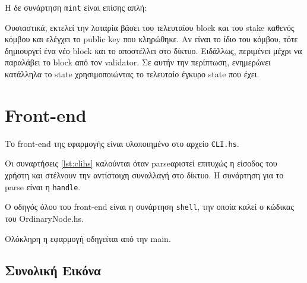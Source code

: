 \documentclass{article}
\newcommand{\eng}[1]{\foreignlanguage{english}{#1}} %
\begin{document}
Η δε συνάρτηση \texttt{\eng{mint}} είναι επίσης απλή:



Ουσιαστικά, εκτελεί την λοταρία βάσει του τελευταίου \eng{block} και του \eng{stake}
καθενός κόμβου και ελέγχει το \eng{public key} που κληρώθηκε. Αν είναι το ίδιο
του κόμβου, τότε δημιουργεί ένα νέο \eng{block} και το αποστέλλει στο δίκτυο.
Ειδάλλως, περιμένει μέχρι να παραλάβει το \eng{block} από τον \eng{validator}.
Σε αυτήν την περίπτωση, ενημερώνει κατάλληλα το \eng{state} χρησιμοποιώντας
το τελευταίο έγκυρο \eng{state} που έχει.

\section{\eng{Front-end}}

Το \eng{front-end} της εφαρμογής είναι υλοποιημένο στο αρχείο \texttt{\eng{CLI.hs}}.



Οι συναρτήσεις \ref{lst:clihs} καλούνται όταν \eng{parse}αριστεί επιτυχώς η είσοδος
του χρήστη και στέλνουν την αντίστοιχη συναλλαγή στο δίκτυο. Η συνάρτηση για το
\eng{parse} είναι η \texttt{\eng{handle}}.



Ο οδηγός όλου του \eng{front-end} είναι η συνάρτηση \texttt{\eng{shell}}, την οποία
καλεί ο κώδικας του \eng{OrdinaryNode.hs}.



Ολόκληρη η εφαρμογή οδηγείται από την \eng{main}.



\subsection{Συνολική Εικόνα}
\end{document}
